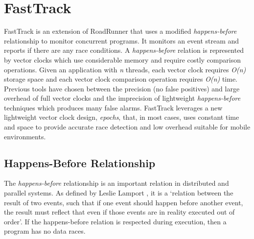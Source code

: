 \documentclass{acm_proc_article-sp}
\begin{document}
\section{FastTrack}
FastTrack is an extension of RoadRunner that uses a modified \emph{happens-before} relationship to monitor concurrent programs. It monitors an event stream and reports if there are any race conditions. A \emph{happens-before} relation is represented by vector clocks \cite{citeulike} which use considerable memory and require costly comparison operations. Given an application with  \emph{n} threads, each vector clock requires \emph{O(n)} storage space and each vector clock comparison operation requires \emph{O(n)} time. Previous tools have chosen between the precision (no false positives) and large overhead of full vector clocks and the imprecision of lightweight \emph{happens-before} techniques which produces many false alarms. FastTrack leverages a new lightweight vector clock design, \emph{epochs}, that, in most cases, uses constant time and space to provide accurate race detection and low overhead suitable for mobile environments.

\subsection{Happens-Before Relationship}
The \emph{happens-before} relationship is an important relation in distributed and parallel systems. As defined by Leslie Lamport \cite{Lamport1978}, it is a `relation between the result of two events, such that if one event should happen before another event, the result must reflect that even if those events are in reality executed out of order'. If the happens-before relation is respected during execution, then a program has no data races. 
\end{document}
